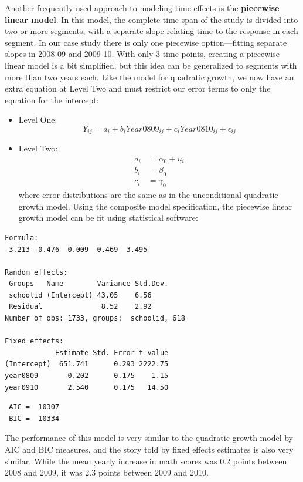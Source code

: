 \documentclass[
]{krantz}
\begin{document}
Another frequently used approach to modeling time effects is the \textbf{piecewise linear model}. In this model, the complete time span of the study is divided into two or more segments, with a separate slope relating time to the response in each segment. In our case study there is only one piecewise option---fitting separate slopes in 2008-09 and 2009-10. With only 3 time points, creating a piecewise linear model is a bit simplified, but this idea can be generalized to segments with more than two years each. Like the model for quadratic growth, we now have an extra equation at Level Two and must restrict our error terms to only the equation for the intercept:

\begin{itemize}
\item
  Level One:
  \begin{equation}
  Y_{ij}=a_{i}+b_{i}Year0809_{ij}+c_{i}Year0810_{ij} + \epsilon_{ij}
  \end{equation}
\item
  Level Two:
  \begin{align*}
  a_{i} & = \alpha_{0} + u_{i}\\
  b_{i} & = \beta_{0} \\
  c_{i} & = \gamma_{0} 
  \end{align*}
  where error distributions are the same as in the unconditional quadratic growth model. Using the composite model specification, the piecewise linear growth model can be fit using statistical software:
\end{itemize}

\begin{verbatim}
Formula: 
-3.213 -0.476  0.009  0.469  3.495 

Random effects:
 Groups   Name        Variance Std.Dev.
 schoolid (Intercept) 43.05    6.56    
 Residual              8.52    2.92    
Number of obs: 1733, groups:  schoolid, 618

Fixed effects:
            Estimate Std. Error t value
(Intercept)  651.741      0.293 2222.75
year0809       0.202      0.175    1.15
year0910       2.540      0.175   14.50
\end{verbatim}

\begin{verbatim}
 AIC =  10307 
 BIC =  10334 
\end{verbatim}

The performance of this model is very similar to the quadratic growth model by AIC and BIC measures, and the story told by fixed effects estimates is also very similar. While the mean yearly increase in math scores was 0.2 points between 2008 and 2009, it was 2.3 points between 2009 and 2010.
\end{document}

